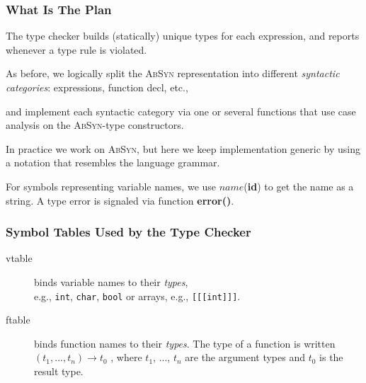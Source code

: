 \documentclass{beamer}
\newcommand{\emp}[1]{\textcolor{DikuRed}{ #1}}
\begin{document}
\begin{frame}[fragile]
	\tableofcontents[currentsection]
\end{frame}


\begin{frame}[fragile,t]
   \frametitle{What Is The Plan}

The type checker builds (statically) unique types for each expression,
and reports whenever a type rule is violated.

\bigskip

As before, we logically split the \textsc{AbSyn} representation into different
{\em syntactic categories}: expressions, function decl, etc.,

\bigskip

and implement each syntactic category via one or several functions
that use case analysis on the \textsc{AbSyn}-type constructors.

\bigskip

\emp{In practice we work on \textsc{AbSyn}, but here we keep implementation
generic by using a notation that resembles the language grammar.}

\bigskip

For symbols representing variable names, we use $name$(\textbf{id}) to get the
name as a string. A type error is signaled via function \textbf{error()}.

\end{frame}



\begin{frame}[fragile,t]
   \frametitle{Symbol Tables Used by the Type Checker}

\bigskip
\bigskip

\begin{description}
    \item[vtable] binds variable names to their {\em types},\\
            e.g., {\tt int}, {\tt char}, {\tt bool} or arrays, e.g., {\tt [[[int]]]}.\bigskip

    \item[ftable] binds function names to their {\em types}. The type of a
            function is written $(t_1 , ..., t_n) \rightarrow t_0$ , where $t_1$, ..., $t_n$ are
            the argument types and $t_0$ is the result type.\bigskip
\end{description}
\end{frame}
\end{document}
